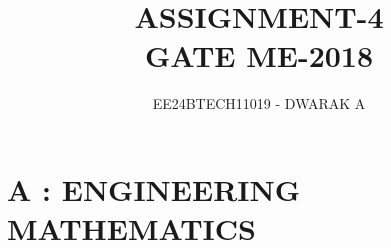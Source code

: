 \documentclass[journal]{IEEEtran}
\begin{document}

\vspace{3cm}

\title{\textbf{ASSIGNMENT-4\\GATE ME-2018}}
\author{EE24BTECH11019 - DWARAK A}
\maketitle

\bigskip

\renewcommand{\thefigure}{\theenumi}
\renewcommand{\thetable}{\theenumi}

\section*{A : ENGINEERING MATHEMATICS}

\bigskip
\end{document}

